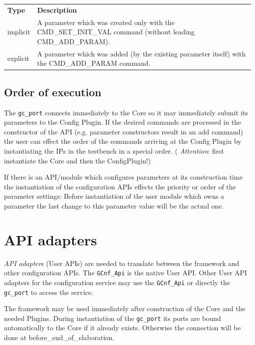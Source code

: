 \vspace{1 cm}

\begin{tabularx}{\textwidth}{|l|X|}
	\cline{1-1}\cline{2-2} {\bf Type}   &  {\bf Description}   \\
	\cline{1-1}\cline{2-2} implicit    &  A parameter which was created only with the CMD\_SET\_INIT\_VAL command (without leading CMD\_ADD\_PARAM).   \\
	\cline{1-1}\cline{2-2} explicit    &  A parameter which was added (by the existing parameter itself) with the CMD\_ADD\_PARAM command.  \\
	\hline
\end{tabularx}



\subsection{Order of execution}
\label{OrderOfExecution}
The \lstinline|gc_port| connects immediately to the Core so it may immediately submit its parameters
to the Config Plugin. If the desired commands are processed in the constructor of the API
(e.g. parameter constructors result in an add command) the user can effect the order of the commands
arriving at the Config Plugin by instantiating the IPs in the testbench in a special order. ({\em
Attention}: first instantiate the \GreenControl Core and then the ConfigPlugin!)

If there is an API/module which configures parameters at its construction time the instantiation of the configuration APIs effects the priority or order of the parameter settings: Before instantiation of the user module which owns a parameter the last change to this parameter value will be the actual one.


\section{API adapters}
{\em API adapter}s (User APIs) are needed to translate between the \GreenConfig framework and other configuration APIs. The \lstinline|GCnf_Api| is the native User API. Other User API adapters for the configuration service may use the \lstinline|GCnf_Api| or directly the \lstinline|gc_port| to access the service.

The framework may be used immediately after construction of the Core and the needed Plugins. During instantiation of the \lstinline|gc_port| its ports are bound automatically to the Core if it already exists. Otherwise the connection will be done at before\_end\_of\_elaboration.


